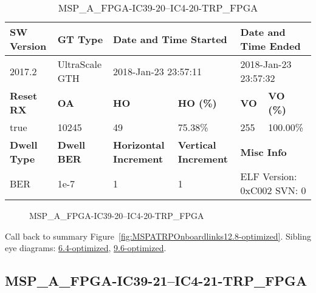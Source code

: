 \begin{table}[h]
\centering
\caption{MSP\_A\_FPGA-IC39-20--IC4-20-TRP\_FPGA}
\label{tab:MSPAFPGAIC3920IC420TRPFPGA12.8-optimized}
\begin{tabular}{@{}|l|l|l|l|l|l|@{}}
\toprule
\textbf{SW Version}                & \textbf{GT Type}   & \multicolumn{2}{l|}{\textbf{Date and Time Started}}            & \multicolumn{2}{l|}{\textbf{Date and Time Ended}}        \\ \midrule
2017.2                       & UltraScale GTH          & \multicolumn{2}{l|}{2018-Jan-23 23:57:11}                   & \multicolumn{2}{l|}{2018-Jan-23 23:57:32}               \\ \midrule
\textbf{Reset RX}                  & \textbf{OA} & \textbf{HO}   & \textbf{HO (\%)} & \textbf{VO} & \textbf{VO (\%)} \\ \midrule
true & 10245        & 49          & 75.38\%        & 255        & 100.00\%       \\ \midrule
\textbf{Dwell Type}                & \textbf{Dwell BER} & \textbf{Horizontal Increment} & \textbf{Vertical Increment}    & \multicolumn{2}{l|}{\textbf{Misc Info}}                  \\ \midrule
BER                            & 1e-7        & 1        & 1           & \multicolumn{2}{l|}{ELF Version: 0xC002 SVN: 0}                         \\ \bottomrule
\end{tabular}
\end{table}

\begin{figure}[h]
\caption{MSP\_A\_FPGA-IC39-20--IC4-20-TRP\_FPGA} \label{fig:MSPAFPGAIC3920IC420TRPFPGA12.8-optimized}
\end{figure}

Call back to summary Figure~\ref{fig:MSPATRPOnboardlinks12.8-optimized}.
Sibling eye diagrams: \hyperref[sec:MSPAFPGAIC3920IC420TRPFPGA6.4-optimized]{6.4-optimized}, \hyperref[sec:MSPAFPGAIC3920IC420TRPFPGA9.6-optimized]{9.6-optimized}.

\clearpage
\newpage


\subsection{MSP\_A\_FPGA-IC39-21--IC4-21-TRP\_FPGA}\label{sec:MSPAFPGAIC3921IC421TRPFPGA12.8-optimized}

